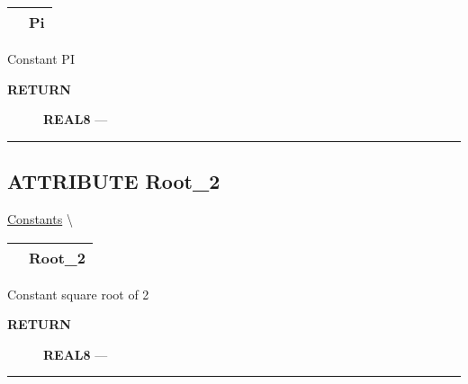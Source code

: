 {\renewcommand{\arraystretch}{1.5}
\begin{tabularx}{\textwidth}{|>{\raggedright\arraybackslash}l|X|}
\hline
\hspace{0pt}\mytexttt{\color{red} } & \textbf{Pi} \\
\hline
\end{tabularx}
}

\par





Constant PI








\par
\begin{description}
\item [\colorbox{tagtype}{\color{white} \textbf{\textsf{RETURN}}}] \textbf{REAL8} --- 
\end{description}




\rule{\linewidth}{0.5pt}
\subsection*{\textsf{\colorbox{headtoc}{\color{white} ATTRIBUTE}
Root\_2}}

\hypertarget{ecldoc:ml_core.constants.root_2}{}
\hspace{0pt} \hyperlink{ecldoc:ML_Core.Constants}{Constants} \textbackslash 

{\renewcommand{\arraystretch}{1.5}
\begin{tabularx}{\textwidth}{|>{\raggedright\arraybackslash}l|X|}
\hline
\hspace{0pt}\mytexttt{\color{red} } & \textbf{Root\_2} \\
\hline
\end{tabularx}
}

\par





Constant square root of 2








\par
\begin{description}
\item [\colorbox{tagtype}{\color{white} \textbf{\textsf{RETURN}}}] \textbf{REAL8} --- 
\end{description}




\rule{\linewidth}{0.5pt}


